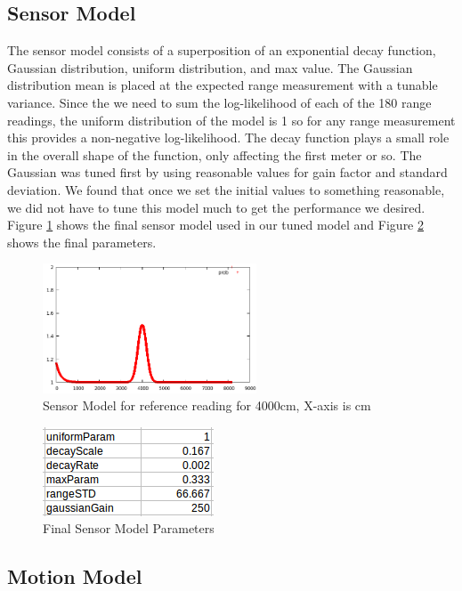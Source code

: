 \documentclass{article}
\begin{document}
\subsection{Sensor Model}
    The sensor model consists of a superposition of an exponential decay function, Gaussian distribution, uniform distribution, and max value.  The Gaussian distribution mean is placed at the expected range measurement with a tunable variance. Since the we need to sum the log-likelihood of each of the 180 range readings, the uniform distribution of the model is 1 so for any range measurement this provides a non-negative log-likelihood. The decay function plays a small role in the overall shape of the function, only affecting the first meter or so. The Gaussian was tuned first by using reasonable values for gain factor and standard deviation.  We found that once we set the initial values to something reasonable, we did not have to tune this model much to get the performance we desired. Figure \ref{fig:2} shows the final sensor model used in our tuned model and Figure \ref{fig:3} shows the final parameters.
\begin{figure}[!h]
    \centering
    \includegraphics[width=2.5in]{media/sensor_model.png}
    \caption{Sensor Model for reference reading for 4000cm, X-axis is cm}
\label{fig:2}
\end{figure}

\begin{figure}[!h]
    \centering
    \includegraphics[width=2.0in]{media/sensor_model_parameters.png}
    \caption{Final Sensor Model Parameters}
\label{fig:3}
\end{figure}

\subsection{Motion Model}
\end{document}
